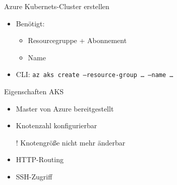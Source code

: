 \begin{flashcard}[Definition]{Azure Kubernets-Cluster erstellen}
    \begin{itemize}
        \item Benötigt:
            \begin{itemize}
                \item Resourcegruppe + Abonnement
                \item Name
            \end{itemize}
        \item CLI:\newline
            \texttt{az aks create --resource-group \ldots\ --name \ldots}
    \end{itemize}
\end{flashcard}

\begin{flashcard}[Definition]{Eigenschaften AKS}
    \begin{itemize}
        \item Master von Azure bereitgestellt
        \item Knotenzahl konfigurierbar
        \item[!] Knotengröße nicht mehr änderbar
        \item HTTP-Routing
        \item SSH-Zugriff
    \end{itemize}
\end{flashcard}



